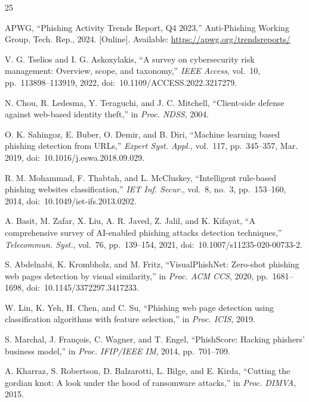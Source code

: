 \documentclass[conference]{IEEEtran}
\begin{document}
\begin{thebibliography}{25}

APWG, ``Phishing Activity Trends Report, Q4 2023,'' Anti-Phishing Working Group, Tech. Rep., 2024.
[Online]. Available: \url{https://apwg.org/trendsreports/}

V. G. Tselios and I. G. Askoxylakis, ``A survey on cybersecurity risk management: Overview,
scope, and taxonomy,'' \emph{IEEE Access}, vol.~10, pp.~113898--113919, 2022,
doi:~10.1109/ACCESS.2022.3217279.

N. Chou, R. Ledesma, Y. Teraguchi, and J. C. Mitchell, ``Client-side defense against web-based
identity theft,'' in \emph{Proc. NDSS}, 2004.

O. K. Sahingoz, E. Buber, O. Demir, and B. Diri, ``Machine learning based phishing detection
from URLs,'' \emph{Expert Syst. Appl.}, vol.~117, pp.~345--357, Mar. 2019,
doi:~10.1016/j.eswa.2018.09.029.

R. M. Mohammad, F. Thabtah, and L. McCluskey, ``Intelligent rule-based phishing websites
classification,'' \emph{IET Inf. Secur.}, vol.~8, no.~3, pp.~153--160, 2014,
doi:~10.1049/iet-ifs.2013.0202.

A. Basit, M. Zafar, X. Liu, A. R. Javed, Z. Jalil, and K. Kifayat, ``A comprehensive survey of
AI-enabled phishing attacks detection techniques,'' \emph{Telecommun. Syst.}, vol.~76,
pp.~139--154, 2021, doi:~10.1007/s11235-020-00733-2.

S. Abdelnabi, K. Krombholz, and M. Fritz, ``VisualPhishNet: Zero-shot phishing web pages
detection by visual similarity,'' in \emph{Proc. ACM CCS}, 2020, pp.~1681--1698,
doi:~10.1145/3372297.3417233.

W. Lin, K. Yeh, H. Chen, and C. Su, ``Phishing web page detection using classification algorithms
with feature selection,'' in \emph{Proc. ICIS}, 2019.

S. Marchal, J. Fran\c{c}ois, C. Wagner, and T. Engel, ``PhishScore: Hacking phishers' business
model,'' in \emph{Proc. IFIP/IEEE IM}, 2014, pp.~701--709.

A. Kharraz, S. Robertson, D. Balzarotti, L. Bilge, and E. Kirda, ``Cutting the gordian knot:
A look under the hood of ransomware attacks,'' in \emph{Proc. DIMVA}, 2015.


\end{thebibliography}
\end{document}
